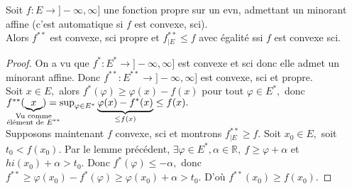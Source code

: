 \begin{theoreme}
    Soit $f:E\to ]-\infty ,\infty ]$ une fonction propre sur un evn, admettant un minorant affine (c'est automatique si $f$ est convexe, sci).\\
    Alors $f^{**}$ est convexe, sci propre et $f^{**}_{|E}\le f$ avec égalité ssi $f$ est convexe sci.
\end{theoreme}
\begin{proof}
    On a vu que $f^*:E^*\to ]-\infty ,\infty ]$ est convexe et sci donc elle admet un minorant affine. Donc $f^{**}:E^{**}\to ]-\infty ,\infty ]$ est convexe, sci et propre.\\
    Soit $x\in E,$ alors $f^*(\varphi )\ge \varphi (x)-f(x)$ pour tout $\varphi \in E^*,$ donc $f^{**}(\underbrace{x}_{\mathclap{\substack{\text{Vu comme}\\\text{élément de }E^{**}}}})=\sup_{\varphi \in E^*}\underbrace{\varphi (x)-f^*(x)}_{\le f(x)}\le f(x).$\\
    Supposons maintenant $f$ convexe, sci et montrons $f^{**}_{|E}\ge f.$ Soit $x_0\in E,$ soit $t_0<f(x_0).$ Par le lemme précédent, $\exists \varphi \in E^*, \alpha \in \mathbb{R}, \ f\ge \varphi + \alpha $ et $hi(x_0)+\alpha >t_0.$ Donc $f^*(\varphi )\le -\alpha ,$ donc $f^{**}\ge \varphi (x_0)-f^*(\varphi )\ge \varphi (x_0)+\alpha >t_0.$ D'où $f^{**}(x_0)\ge f(x_0).$
\end{proof}


